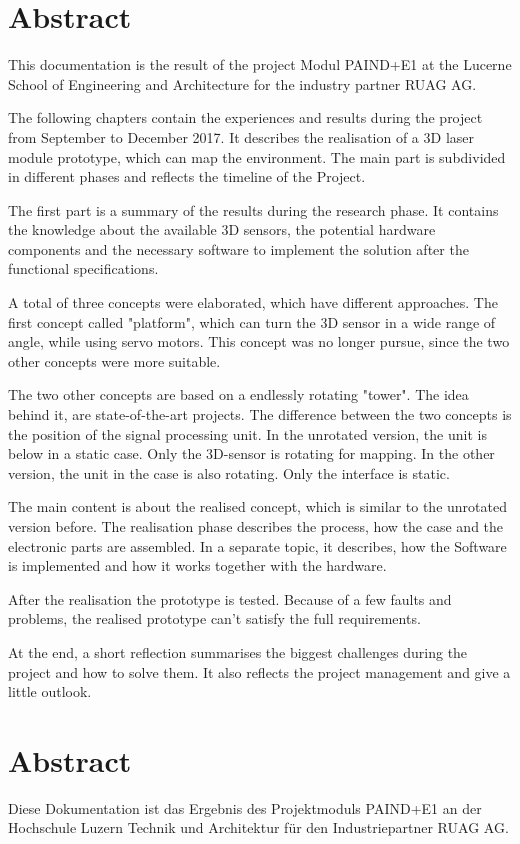 \chapter*{Abstract}
\label{chap:Abstract}
This documentation is the result of the project Modul PAIND+E1 at the Lucerne School of Engineering and Architecture for the industry partner RUAG AG. 

The following chapters contain the experiences and results during the project from September to December 2017. It describes the realisation of a 3D laser module prototype, which can map the environment. The main part is subdivided in different phases and reflects the timeline of the Project. 

The first part is a summary of the results during the research phase. It contains the knowledge about the available 3D sensors, the potential hardware components and the necessary software to implement the solution after the functional specifications. 

A total of three concepts were elaborated, which have different approaches. The first concept called "platform", which can turn the 3D sensor in a wide range of angle, while using servo motors. This concept was no longer pursue, since the two other concepts were more suitable.

The two other concepts are based on a endlessly rotating "tower". The idea behind it, are state-of-the-art projects. The difference between the two concepts is the position of the signal processing unit. In the unrotated version, the unit is below in a static case. Only the 3D-sensor is rotating for mapping. In the other version, the unit in the case is also rotating. Only the interface is static. 

The main content is about the realised concept, which is similar to the unrotated version before. The realisation phase describes the process, how the case and the electronic parts are assembled. In a separate topic, it describes, how the Software is implemented and how it works together with the hardware. 

After the realisation the prototype is tested. Because of a few faults and problems, the realised prototype can't satisfy the full requirements. 

At the end, a short reflection summarises the biggest challenges during the project and how to solve them. It also reflects the project management and give a little outlook.


\chapter*{Abstract}
Diese Dokumentation ist das Ergebnis des Projektmoduls PAIND+E1 an der Hochschule Luzern Technik und Architektur für den Industriepartner RUAG AG.


